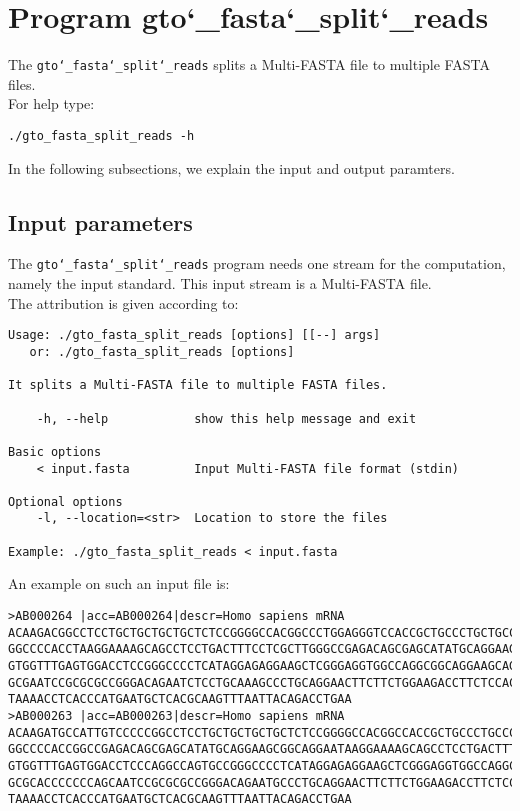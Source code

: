 \section{Program gto\char`_fasta\char`_split\char`_reads}
The \texttt{gto\char`_fasta\char`_split\char`_reads} splits a Multi-FASTA file to multiple FASTA files.\\
For help type:
\begin{lstlisting}
./gto_fasta_split_reads -h
\end{lstlisting}
In the following subsections, we explain the input and output paramters.

\subsection*{Input parameters}

The \texttt{gto\char`_fasta\char`_split\char`_reads} program needs one stream for the computation, namely the input standard. This input stream is a Multi-FASTA file.\\
The attribution is given according to:
\begin{lstlisting}
Usage: ./gto_fasta_split_reads [options] [[--] args]
   or: ./gto_fasta_split_reads [options]

It splits a Multi-FASTA file to multiple FASTA files.

    -h, --help            show this help message and exit

Basic options
    < input.fasta         Input Multi-FASTA file format (stdin)

Optional options
    -l, --location=<str>  Location to store the files

Example: ./gto_fasta_split_reads < input.fasta
\end{lstlisting}
An example on such an input file is:
\begin{lstlisting}
>AB000264 |acc=AB000264|descr=Homo sapiens mRNA 
ACAAGACGGCCTCCTGCTGCTGCTGCTCTCCGGGGCCACGGCCCTGGAGGGTCCACCGCTGCCCTGCTGCCATTGTCCCC
GGCCCCACCTAAGGAAAAGCAGCCTCCTGACTTTCCTCGCTTGGGCCGAGACAGCGAGCATATGCAGGAAGCGGCAGGAA
GTGGTTTGAGTGGACCTCCGGGCCCCTCATAGGAGAGGAAGCTCGGGAGGTGGCCAGGCGGCAGGAAGCAGGCCAGTGCC
GCGAATCCGCGCGCCGGGACAGAATCTCCTGCAAAGCCCTGCAGGAACTTCTTCTGGAAGACCTTCTCCACCCCCCCAGC
TAAAACCTCACCCATGAATGCTCACGCAAGTTTAATTACAGACCTGAA
>AB000263 |acc=AB000263|descr=Homo sapiens mRNA 
ACAAGATGCCATTGTCCCCCGGCCTCCTGCTGCTGCTGCTCTCCGGGGCCACGGCCACCGCTGCCCTGCCCCTGGAGGGT
GGCCCCACCGGCCGAGACAGCGAGCATATGCAGGAAGCGGCAGGAATAAGGAAAAGCAGCCTCCTGACTTTCCTCGCTTG
GTGGTTTGAGTGGACCTCCCAGGCCAGTGCCGGGCCCCTCATAGGAGAGGAAGCTCGGGAGGTGGCCAGGCGGCAGGAAG
GCGCACCCCCCCAGCAATCCGCGCGCCGGGACAGAATGCCCTGCAGGAACTTCTTCTGGAAGACCTTCTCCTCCTGCAAA
TAAAACCTCACCCATGAATGCTCACGCAAGTTTAATTACAGACCTGAA
\end{lstlisting}

